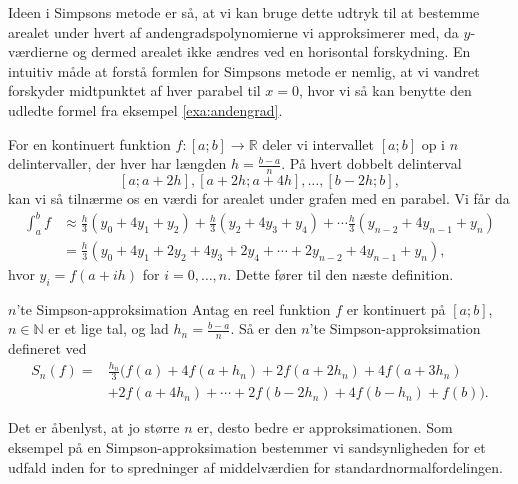 Ideen i Simpsons metode er så, at vi kan bruge dette udtryk til at bestemme arealet under hvert af andengradspolynomierne vi approksimerer med, da $y$-værdierne og dermed arealet ikke ændres ved en horisontal forskydning.
En intuitiv måde at forstå formlen for Simpsons metode er nemlig, at vi vandret forskyder midtpunktet af hver parabel til $x=0$, hvor vi så kan benytte den udledte formel fra eksempel \ref{exa:andengrad}.

For en kontinuert funktion $f:[a;b]\to \mathbb{R}$ deler vi intervallet $[a;b]$ op i $n$ delintervaller, der hver har længden $h=\frac{b-a}{n}$.
På hvert dobbelt delinterval
\[
[a;a+2h], [a+2h;a+4h], \ldots , [b-2h;b],
\] 
kan vi så tilnærme os en værdi for arealet under grafen med en parabel.
Vi får da
\begin{equation*}
\begin{split}
  \int_{a}^{b} f &\approx \frac{h}{3} \left(y_0 + 4y_1 +y_2\right) + \frac{h}{3} \left(y_2 + 4y_3 +y_4\right) + \cdots \frac{h}{3} \left(y_{n-2} + 4y_{n-1} +y_n\right)\\
  &=\frac{h}{3} \left(y_0 + 4y_1 + 2y_2 + 4y_3 + 2y_4 + \cdots +2y_{n-2} + 4 y_{n-1} + y_n\right),
\end{split}
\end{equation*}
hvor $y_i=f(a+ih)$ for $i=0,\ldots , n$. 
Dette fører til den næste definition.

\begin{definition}[label=def:Simpson]{$n$'te Simpson-approksimation}{}
  Antag en reel funktion $f$ er kontinuert på $[a;b]$, $n \in \mathbb{N}$ er et lige tal, og lad $h_n=\frac{b-a}{n}$.
  Så er den $n$'te Simpson-approksimation defineret ved
  \begin{equation*}
  \begin{split}
    S_n(f)=&\frac{h_n}{3} (f(a) + 4f(a+h_n) + 2f(a+2h_n) + 4f(a+3h_n) \\
    &+ 2f(a+4h_n) + \cdots + 2f(b-2h_n) + 4f(b-h_n)+ f(b)).
  \end{split}
  \end{equation*}
\end{definition}

Det er åbenlyst, at jo større $n$ er, desto bedre er approksimationen. 
Som eksempel på en Simpson-approksimation bestemmer vi sandsynligheden for et udfald inden for to spredninger af middelværdien for standardnormalfordelingen.


